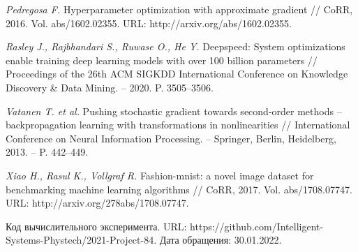 \documentclass[12pt]{a&t}
\begin{document}
\begin{thebibliography}{10}
{\it Pedregosa F.}
Hyperparameter optimization with approximate gradient // CoRR, 2016. Vol. abs/1602.02355. URL: http://arxiv.org/abs/1602.02355.

{\it Rasley J., Rajbhandari S., Ruwase O., He Y.}
Deepspeed: System optimizations enable training deep learning models with over 100 billion parameters // Proceedings of the 26th ACM SIGKDD International Conference on Knowledge Discovery \& Data Mining. -- 2020. P. 3505--3506.

{\it Vatanen T. et al.}
Pushing stochastic gradient towards second-order methods – backpropagation learning with transformations in nonlinearities // International Conference on Neural Information Processing. – Springer, Berlin, Heidelberg, 2013. – P. 442–449.

{\it Xiao H., Rasul K., Vollgraf R.}
Fashion-mnist: a novel image dataset for benchmarking machine learning algorithms // CoRR, 2017. Vol. abs/1708.07747. URL: http://arxiv.org/278abs/1708.07747.


Код вычислительного эксперимента. 
URL: https://github.com/Intelligent-Systems-Phystech/2021-Project-84. Дата обращения: 30.01.2022.

\end{thebibliography}




\end{document}
